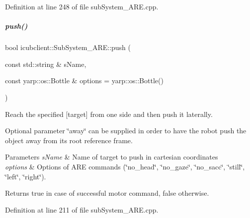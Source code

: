 Definition at line 248 of file sub\+System\+\_\+\+A\+R\+E.\+cpp.

\mbox{\label{group__icubclient__subsystems_a4b1fe9a6c979be5ec739d319ad0e3d94}} 
\subparagraph{\texorpdfstring{push()}{push()}}
{\footnotesize\ttfamily bool icubclient\+::\+Sub\+System\+\_\+\+A\+R\+E\+::push (\begin{DoxyParamCaption}\item[{const std\+::string \&}]{s\+Name,  }\item[{const yarp\+::os\+::\+Bottle \&}]{options = {\ttfamily yarp\+:\+:os\+:\+:Bottle()} }\end{DoxyParamCaption})}



Reach the specified \mbox{[}target\mbox{]} from one side and then push it laterally. 

Optional parameter \char`\"{}away\char`\"{} can be supplied in order to have the robot push the object away from its root reference frame. 
\begin{DoxyParams}{Parameters}
{\em s\+Name} & Name of target to push in cartesian coordinates \\
\hline
{\em options} & Options of A\+RE commands (\char`\"{}no\+\_\+head\char`\"{}, \char`\"{}no\+\_\+gaze\char`\"{}, \char`\"{}no\+\_\+sacc\char`\"{}, \char`\"{}still\char`\"{}, \char`\"{}left\char`\"{}, \char`\"{}right\char`\"{}). \\
\hline
\end{DoxyParams}
\begin{DoxyReturn}{Returns}
true in case of successful motor command, false otherwise. 
\end{DoxyReturn}


Definition at line 211 of file sub\+System\+\_\+\+A\+R\+E.\+cpp.

